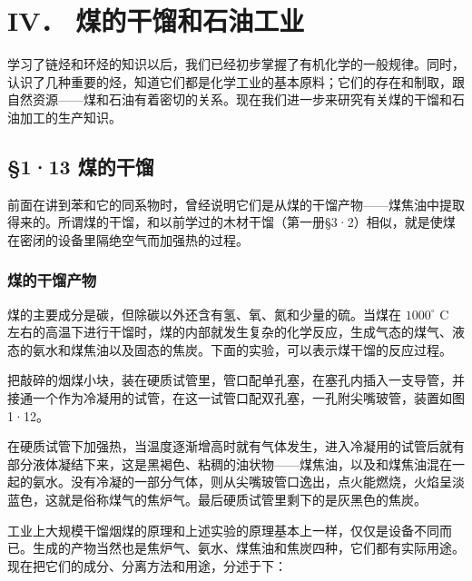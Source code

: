 \section{IV． 煤的干馏和石油工业}\label{iv-ux7164ux7684ux5e72ux998fux548cux77f3ux6cb9ux5de5ux4e1a}

学习了链烃和环烃的知识以后，我们已经初步掌握了有机化学的一般规律。同时，认识了几种重要的烃，知道它们都是化学工业的基本原料；它们的存在和制取，跟自然资源------煤和石油有着密切的关系。现在我们进一步来研究有关煤的干馏和石油加工的生产知识。

\subsection{§1·13 煤的干馏}

前面在讲到苯和它的同系物时，曾经说明它们是从煤的干馏产物------煤焦油中提取得来的。所谓煤的干馏，和以前学过的木材干馏（第一册§3·2）相似，就是使煤在密闭的设备里隔绝空气而加强热的过程。

\subsubsection{煤的干馏产物}

煤的主要成分是碳，但除碳以外还含有氢、氧、氮和少量的硫。当煤在
\(1000^{\circ}\) C
左右的高温下进行干馏时，煤的内部就发生复杂的化学反应，生成气态的煤气、液态的氨水和煤焦油以及固态的焦炭。下面的实验，可以表示煤干馏的反应过程。

把敲碎的烟煤小块，装在硬质试管里，管口配单孔塞，在塞孔内插入一支导管，并接通一个作为冷凝用的试管，在这一试管口配双孔塞，一孔附尖嘴玻管，装置如图1·12。

在硬质试管下加强热，当温度逐渐增高时就有气体发生，进入冷凝用的试管后就有部分液体凝结下来，这是黑褐色、粘稠的油状物------煤焦油，以及和煤焦油混在一起的氨水。没有冷凝的一部分气体，则从尖嘴玻管口逸出，点火能燃烧，火焰呈淡蓝色，这就是俗称煤气的焦炉气。最后硬质试管里剩下的是灰黑色的焦炭。

工业上大规模干馏烟煤的原理和上述实验的原理基本上一样，仅仅是设备不同而已。生成的产物当然也是焦炉气、氨水、煤焦油和焦炭四种，它们都有实际用途。现在把它们的成分、分离方法和用途，分述于下：

